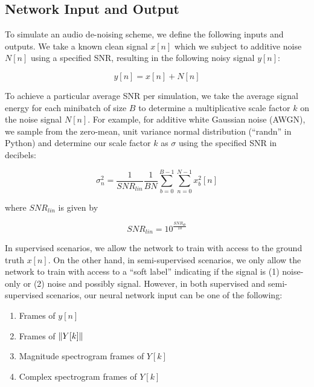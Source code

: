 
\subsection{Network Input and Output}
To simulate an audio de-noising scheme, we define the following inputs and outputs. We take a known clean signal $x[n]$ which we subject to additive noise $N[n]$ using a specified SNR, resulting in the following noisy signal $y[n]$:

\begin{equation}
y[n] = x[n] + N[n]
\end{equation}

To achieve a particular average SNR per simulation, we take the average signal energy for each minibatch of size $B$ to determine a multiplicative scale factor $k$ on the noise signal $N[n]$. For example, for additive white Gaussian noise (AWGN), we sample from the zero-mean, unit variance normal distribution (``randn'' in Python) and determine our scale factor $k$ as $\sigma$ using the specified SNR in decibels:

\begin{equation}\label{eq:siggy}
\sigma_n^{2} = \dfrac{1}{SNR_{lin}}\dfrac{1}{BN}\sum_{b=0}^{B-1} \sum_{n=0}^{N-1} x_{b}^{2}[n]
\end{equation}

where $SNR_{lin}$ is given by

\begin{equation}
SNR_{lin} = 10^{\frac{SNR_{db}}{10}}
\end{equation}

In supervised scenarios, we allow the network to train with access to the ground truth $x[n]$. On the other hand, in semi-supervised scenarios, we only allow the network to train with access to a ``soft label'' indicating if the signal is (1) noise-only or (2) noise and possibly signal. \cite{stow} However, in both supervised and semi-supervised scenarios, our neural network input can be one of the following:

\begin{enumerate}
    \item Frames of $y[n]$
    \item Frames of $\lVert Y[k]\rVert$
    \item Magnitude spectrogram frames of $Y[k]$
    \item Complex spectrogram frames of $Y[k]$
\end{enumerate}

